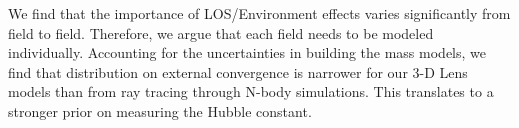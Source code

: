 We find that the importance of LOS/Environment effects varies significantly from field to field. Therefore, we argue that each field needs to be modeled individually. Accounting for the uncertainties in building the mass models, we find that distribution on external convergence is narrower for our 3-D Lens models than from ray tracing through N-body simulations. This translates to a stronger prior on measuring the Hubble constant.
